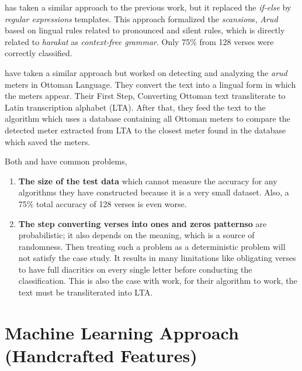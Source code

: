 \cite{Alnagdawi2013FindingArabicPoemMeter} has taken a similar approach to the previous work, but it replaced the \textit{if-else} by \textit{regular expressions} templates. This approach formalized the \textit{scansion}s, \textit{Arud} based on lingual rules related to pronounced and silent rules, which is directly related to \textit{harakat} as \textit{context-free grammar}. Only 75\% from 128 verses were correctly classified. 

\cite{Kurt2012AlgorithmForDetectionAnalysis} have taken a similar approach but worked on detecting and analyzing the \textit{arud} meters in Ottoman Language. They convert the text into a lingual form in which the meters appear. Their First Step, Converting Ottoman text transliterate to Latin transcription alphabet (LTA). After that, they feed the text to the algorithm which uses a database containing all Ottoman meters to compare the detected meter extracted from LTA to the closest meter found in the database which saved the meters.

Both \cite{Abuata2016RuleBasedAlgorithmFor} and \cite{Alnagdawi2013FindingArabicPoemMeter} have common problems,

\begin{enumerate}
\item \textbf{The size of the test data} which cannot measure the accuracy for any algorithms they have constructed because it is a very small dataset. Also, a 75\% total accuracy of 128 verses is even worse.
  \item \textbf{The step converting verses into ones and zeros patternso} are probabilistic; it also depends on the meaning, which is a source of randomness. Then treating such a problem as a deterministic problem will not satisfy the case study. It results in many limitations like obligating verses to have full diacritics on every single letter before conducting the classification. This is also the case with \cite{Kurt2012AlgorithmForDetectionAnalysis} work, for their algorithm to work, the text must be transliterated into LTA.
  \end{enumerate}


\section{Machine Learning Approach (Handcrafted Features)}\label{sec:mach-learn-appr}


